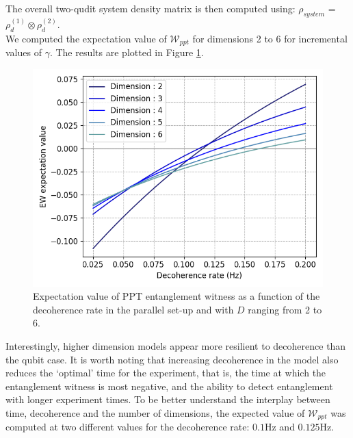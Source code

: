 \documentclass[%
 12pt,
 superscriptaddress,
 amsmath,
 amssymb,
 onecolumn,
 longbibliography
]{revtex4-2}
\begin{document}
\indent The overall two-qudit system density matrix is then computed using: $\rho_{system}$ = $\rho_d^{(1)}\otimes\rho_d^{(2)}$.\\
\indent We computed the expectation value of $\mathcal{W}_{ppt}$ for dimensions 2 to 6 for incremental values of $\gamma$. The results are plotted in Figure \ref{fig:qudit_deco}.\\
%	
	\begin{figure}
	\centering
		\includegraphics[width=.5\columnwidth]{EW_para_qudits_deco.png}
	    \caption{Expectation value of PPT entanglement witness as a function of the decoherence rate in the parallel set-up and with $D$ ranging from 2 to 6.} \label{fig:qudit_deco}
		\par\medskip
	\end{figure}
%
\indent Interestingly, higher dimension models appear more resilient to decoherence than the qubit case. It is worth noting that increasing decoherence in the model also reduces the `optimal’ time for the experiment, that is, the time at which the entanglement witness is most negative, and the ability to detect entanglement with longer experiment times. To be better understand the interplay between time, decoherence and the number of dimensions, the expected value of $\mathcal{W}_{ppt}$ was computed at two different values for the decoherence rate: $0.1$Hz and $0.125$Hz.\\
\end{document}
